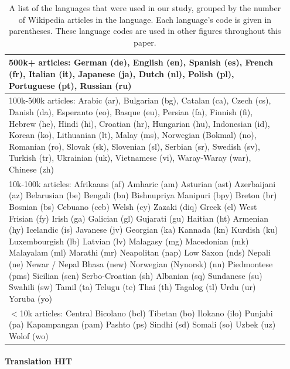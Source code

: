 \documentclass[11pt]{article}
\begin{document}
\begin{table}[h]
\scriptsize 
\begin{center}
\begin{tabular}{|p{0.95\linewidth}|}
\hline
{\sc 500k+ articles:} German (de), English (en), Spanish (es), French (fr), Italian (it), Japanese (ja), Dutch (nl), Polish (pl), Portuguese (pt), Russian (ru)\\
\hline
{\sc 100k-500k articles:} Arabic (ar), Bulgarian (bg), Catalan (ca), Czech (cs), Danish (da), Esperanto (eo), Basque (eu), Persian (fa), Finnish (fi), Hebrew (he), Hindi (hi), Croatian (hr), Hungarian (hu), Indonesian (id), Korean (ko), Lithuanian (lt), Malay (ms), Norwegian (Bokmal) (no), Romanian (ro), Slovak (sk), Slovenian (sl), Serbian (sr), Swedish (sv), Turkish (tr), Ukrainian (uk), Vietnamese (vi), Waray-Waray (war), Chinese (zh)\\
\hline
{\sc 10k-100k articles:}
Afrikaans (af) Amharic (am) Asturian (ast) Azerbaijani (az) Belarusian (be) Bengali (bn) Bishnupriya Manipuri (bpy) Breton (br) Bosnian (bs) Cebuano (ceb) Welsh (cy) Zazaki (diq) Greek (el) West Frisian (fy) Irish (ga) Galician (gl) Gujarati (gu) Haitian (ht) Armenian (hy) Icelandic (is) Javanese (jv) Georgian (ka) Kannada (kn) Kurdish (ku) Luxembourgish (lb) Latvian (lv) Malagasy (mg) Macedonian (mk) Malayalam (ml) Marathi (mr) Neapolitan (nap) Low Saxon (nds) Nepali (ne) Newar / Nepal Bhasa (new) Norwegian (Nynorsk) (nn) Piedmontese (pms) Sicilian (scn) Serbo-Croatian (sh) Albanian (sq) Sundanese (su) Swahili (sw) Tamil (ta) Telugu (te) Thai (th) Tagalog (tl) Urdu (ur) Yoruba (yo)\\ 
\hline
{\sc $<$10k articles:} Central Bicolano (bcl) Tibetan (bo) Ilokano (ilo) Punjabi (pa) Kapampangan (pam) Pashto (ps) Sindhi (sd) Somali (so) Uzbek (uz) Wolof (wo)\\

\hline
\end{tabular}
\end{center}
\normalsize
\caption{A list of the languages that were used in our study, grouped by the number of Wikipedia articles in the language.  Each language's code is given in parentheses.  These language codes are used in other figures throughout this paper.}\label{wikipedia-buckets}
\end{table}%

\paragraph{Translation HIT}
\end{document}
